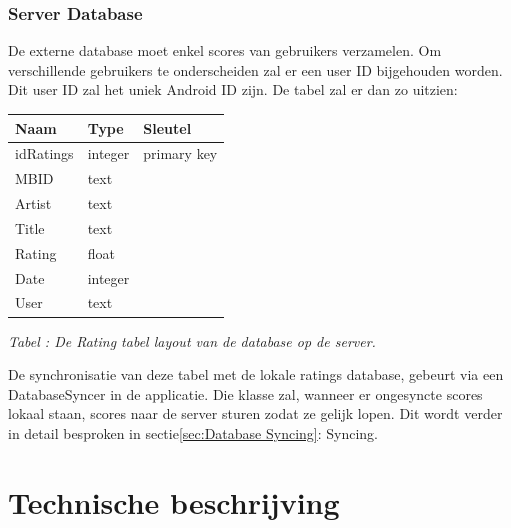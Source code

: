 \documentclass[11pt,a4paper]{article}
\newcounter{tabc}
\newcommand{\increaseTabID} {%
   \stepcounter{tabc}%
   \thetabc}
\newcommand{\tabID}[1]{\small \textit{Tabel \increaseTabID : #1} \\ \normalsize}
\begin{document}
\newpage
	\subsubsection{Server Database}
	\label{sec:Server Database}
	\label{sec:Extdb}
	De externe database moet enkel scores van gebruikers verzamelen. Om verschillende gebruikers te onderscheiden zal er een user ID bijgehouden worden. Dit user ID zal het uniek Android ID zijn. De tabel zal er dan zo uitzien: \\ \newline
		\begin{tabular}{| l | l | l | }
		\hline
		 Naam		& Type		& Sleutel		\\
		 \hline 
		 idRatings 	& integer 	& primary key 	\\
		 MBID 		& text 		& 				\\
		 Artist		& text 		& 				\\
		 Title 		& text 		& 				\\
		 Rating		& float 	& 				\\
		 Date 		& integer 	& 				\\
		 User		& text 		& 				\\
		\hline
		\end{tabular}
		\label{tab:extDB}
	
	\tabID{De Rating tabel layout van de database op de server.} 
		
	De synchronisatie van deze tabel met de lokale ratings database, gebeurt via een DatabaseSyncer in de applicatie. Die klasse zal, wanneer er ongesyncte scores lokaal staan, scores naar de server sturen zodat ze gelijk lopen. Dit wordt verder in detail besproken in sectie\ref{sec:Database Syncing}: Syncing.
	
\newpage %

	
	
\newpage %
\section{Technische beschrijving}
\label{sec:Technisch}
\end{document}
